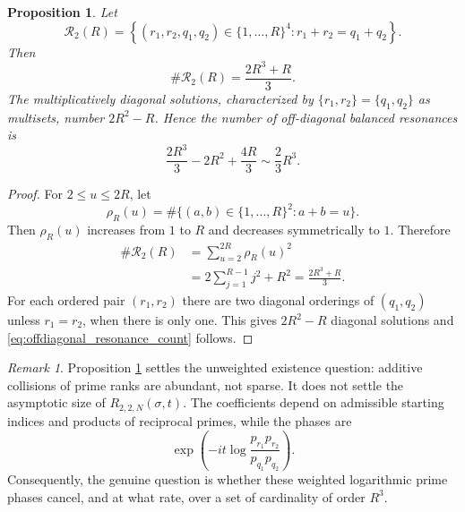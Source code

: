 \documentclass[11pt]{amsart}
\numberwithin{equation}{section}
\theoremstyle{plain}
\newtheorem{proposition}[theorem]{Proposition}
\theoremstyle{definition}
\theoremstyle{remark}
\newtheorem{remark}[theorem]{Remark}
\begin{document}
\begin{proposition}
\label{prop:balanced_resonance_count}
Let
\begin{equation}
\mathcal R_2(R)
=
\left\{(r_1,r_2,q_1,q_2)\in\{1,\ldots,R\}^4:
 r_1+r_2=q_1+q_2\right\}.
\label{eq:balanced_resonance_set}
\end{equation}
Then
\begin{equation}
\#\mathcal R_2(R)=\frac{2R^3+R}{3}.
\label{eq:balanced_resonance_count}
\end{equation}
The multiplicatively diagonal solutions, characterized by
$\{r_1,r_2\}=\{q_1,q_2\}$ as multisets, number $2R^2-R$.  Hence the number of off-diagonal balanced resonances is
\begin{equation}
\frac{2R^3}{3}-2R^2+\frac{4R}{3}
\sim \frac{2}{3}R^3.
\label{eq:offdiagonal_resonance_count}
\end{equation}
\end{proposition}

\begin{proof}
For $2\le u\le2R$, let
\begin{equation}
\rho_R(u)=\#\{(a,b)\in\{1,\ldots,R\}^2:a+b=u\}.
\label{eq:rho_R_definition}
\end{equation}
Then $\rho_R(u)$ increases from $1$ to $R$ and decreases symmetrically to $1$.  Therefore
\begin{align}
\#\mathcal R_2(R)
&=\sum_{u=2}^{2R}\rho_R(u)^2
\label{eq:resonance_count_square_sum}\\
&=2\sum_{j=1}^{R-1}j^2+R^2
=\frac{2R^3+R}{3}.
\label{eq:resonance_count_evaluation}
\end{align}
For each ordered pair $(r_1,r_2)$ there are two diagonal orderings of $(q_1,q_2)$ unless $r_1=r_2$, when there is only one.  This gives $2R^2-R$ diagonal solutions and \eqref{eq:offdiagonal_resonance_count} follows.
\end{proof}

\begin{remark}
\label{rem:resonance_abundance_not_weighted_size}
Proposition \ref{prop:balanced_resonance_count} settles the unweighted existence question: additive collisions of prime ranks are abundant, not sparse.  It does not settle the asymptotic size of $R_{2,2,N}(\sigma,t)$.  The coefficients depend on admissible starting indices and products of reciprocal primes, while the phases are
\begin{equation}
\exp\left(-it\log\frac{p_{r_1}p_{r_2}}{p_{q_1}p_{q_2}}\right).
\label{eq:weighted_resonance_phase_again}
\end{equation}
Consequently, the genuine question is whether these weighted logarithmic prime phases cancel, and at what rate, over a set of cardinality of order $R^3$.
\end{remark}
\end{document}
